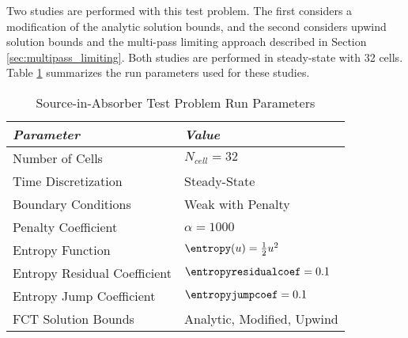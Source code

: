 Two studies are performed with this test
problem. The first considers a modification of the analytic solution bounds,
and the second considers upwind solution bounds and the multi-pass limiting
approach described in Section \ref{sec:multipass_limiting}.
Both studies are performed in steady-state with 32 cells.
Table \ref{tab:interface_run_parameters} summarizes the run parameters used
for these studies.

\begin{table}[ht]\caption{Source-in-Absorber Test Problem Run Parameters}
\label{tab:interface_run_parameters}
\centering
\begin{tabular}{l l}\toprule
\emph{Parameter} & \emph{Value}\\\midrule
Number of Cells & $N_{cell} = 32$\\
Time Discretization & Steady-State\\
Boundary Conditions & Weak with Penalty\\
Penalty Coefficient & $\alpha=1000$\\\midrule
Entropy Function & $\entropy(u) = \frac{1}{2}u^2$\\
Entropy Residual Coefficient & $\entropyresidualcoef = 0.1$\\
Entropy Jump Coefficient & $\entropyjumpcoef = 0.1$\\\midrule
FCT Solution Bounds & Analytic, Modified, Upwind\\
\bottomrule\end{tabular}
\end{table}

